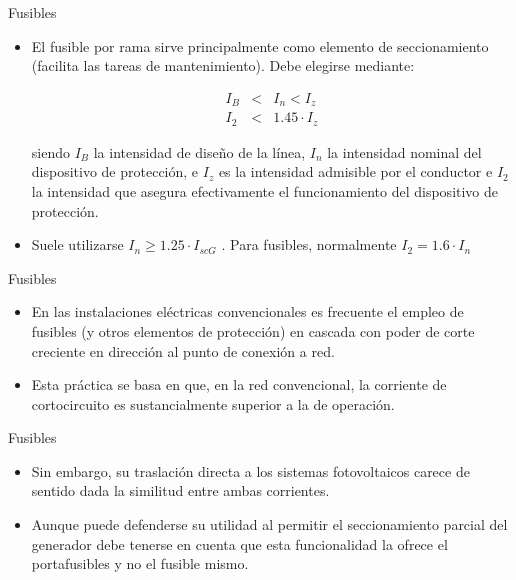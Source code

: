 \documentclass[xcolor={usenames,svgnames,dvipsnames}]{beamer}
\begin{document}
\begin{frame}[label=sec-5-1-6]{Fusibles}
\begin{itemize}
\item El \alert{fusible por rama} sirve principalmente como \alert{elemento de
seccionamiento} (facilita las tareas de mantenimiento). Debe elegirse
mediante:

$$\begin{aligned}
   I_{B} & < & I_{n}<I_{z}\\
   I_{2} & < & 1.45\cdot I_{z}\end{aligned}$$

siendo $I_{B}$ la intensidad de diseño de la línea, $I_{n}$ la
intensidad nominal del dispositivo de protección, e $I_{z}$ es la
intensidad admisible por el conductor e $I_{2}$ la intensidad que
asegura efectivamente el funcionamiento del dispositivo de
protección.

\item Suele utilizarse $I_{n}\geq1.25\cdot I_{scG}$ . Para fusibles,
normalmente $I_{2}=1.6\cdot I_{n}$
\end{itemize}
\end{frame}

\begin{frame}[label=sec-5-1-7]{Fusibles}
\begin{itemize}
\item En las instalaciones eléctricas convencionales es frecuente el empleo
de fusibles (y otros elementos de protección) en cascada con poder de
corte creciente en dirección al punto de conexión a red.

\item Esta práctica se basa en que, en la red convencional, la corriente de
cortocircuito es sustancialmente superior a la de operación.
\end{itemize}
\end{frame}

\begin{frame}[label=sec-5-1-8]{Fusibles}
\begin{itemize}
\item Sin embargo, su traslación directa a los sistemas fotovoltaicos
carece de sentido dada la similitud entre ambas corrientes.

\item Aunque puede defenderse su utilidad al permitir el seccionamiento
parcial del generador debe tenerse en cuenta que esta funcionalidad
la ofrece el portafusibles y no el fusible mismo.
\end{itemize}
\end{frame}
\end{document}
